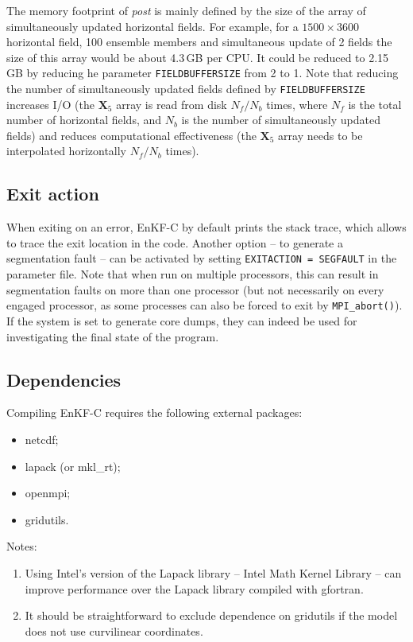 \documentclass[11pt]{report}
\newcommand{\mb} {\mathbf}
\begin{document}
The memory footprint of \emph{post} is mainly defined by the size of the array of simultaneously updated horizontal fields.
For example, for a $1500 \times 3600$ horizontal field, 100 ensemble members and simultaneous update of 2 fields the size of this array would be about 4.3\,GB per CPU.
It could be reduced to 2.15\,GB by reducing he parameter \verb|FIELDBUFFERSIZE| from 2 to 1.
Note that reducing the number of simultaneously updated fields defined by \verb|FIELDBUFFERSIZE| increases I/O (the $\mb X_5$ array is read from disk $N_f / N_b$ times, where $N_f$ is the total number of horizontal fields, and $N_b$ is the number of simultaneously updated fields) and reduces computational effectiveness (the $\mb X_5$ array needs to be interpolated horizontally $N_f / N_b$ times).

\subsection{Exit action}

When exiting on an error, EnKF-C by default prints the stack trace, which allows to trace the exit location in the code.
Another option -- to generate a segmentation fault -- can be activated by setting \verb|EXITACTION = SEGFAULT| in the parameter file.
Note that when run on multiple processors, this can result in segmentation faults on more than one processor (but not necessarily on every engaged processor, as some processes can also be forced to exit by \verb|MPI_abort()|).
If the system is set to generate core dumps, they can indeed be used for investigating the final state of the program.

\subsection{Dependencies}

Compiling EnKF-C requires the following external packages:

\begin{itemize}
\item netcdf;
\item lapack (or mkl\_rt);
\item openmpi;
\item gridutils.
\end{itemize}

Notes:
\begin{enumerate}
\item Using Intel's version of the Lapack library -- Intel Math Kernel Library -- can improve performance over the Lapack library compiled with gfortran.
\item It should be straightforward to exclude dependence on gridutils if the model does not use curvilinear coordinates.
\end{enumerate}
\end{document}
